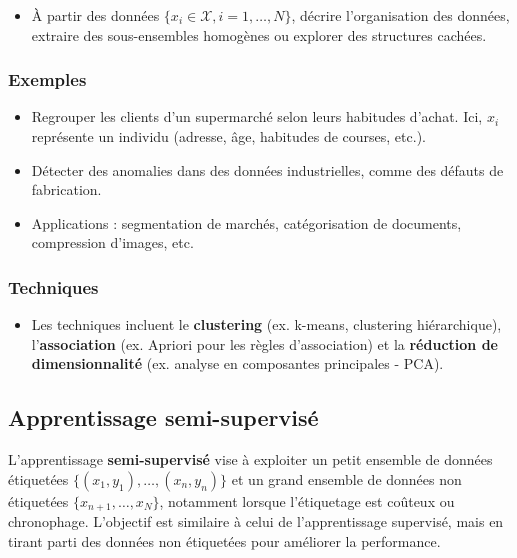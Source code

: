 \documentclass[a4paper,12pt]{report}
\begin{document}
        \begin{itemize}
            \item  À partir des données \(\{x_i \in \mathcal{X}, i = 1, \ldots, N\}\), décrire l’organisation des données, extraire des sous-ensembles homogènes ou explorer des structures cachées.
        \end{itemize}
        
        \subsubsection*{Exemples}
        
        \begin{itemize}
            \item  Regrouper les clients d’un supermarché selon leurs habitudes d’achat. Ici, \(x_i\) représente un individu (adresse, âge, habitudes de courses, etc.).
            \item  Détecter des anomalies dans des données industrielles, comme des défauts de fabrication.
            \item  Applications : segmentation de marchés, catégorisation de documents, compression d’images, etc.
        \end{itemize}
        
        \subsubsection*{Techniques}
        
        \begin{itemize}
            \item Les techniques incluent le \textbf{clustering} (ex. k-means, clustering hiérarchique), l’\textbf{association} (ex. Apriori pour les règles d’association) et la \textbf{réduction de dimensionnalité} (ex. analyse en composantes principales - PCA).
        \end{itemize}
        
        \subsection{Apprentissage semi-supervisé}
        
        L'apprentissage \textbf{semi-supervisé} vise à exploiter un petit ensemble de données étiquetées \(\{(x_1, y_1), \ldots, (x_n, y_n)\}\) et un grand ensemble de données non étiquetées \(\{x_{n+1}, \ldots, x_N\}\), notamment lorsque l’étiquetage est coûteux ou chronophage. L’objectif est similaire à celui de l’apprentissage supervisé, mais en tirant parti des données non étiquetées pour améliorer la performance.
        
\end{document}
